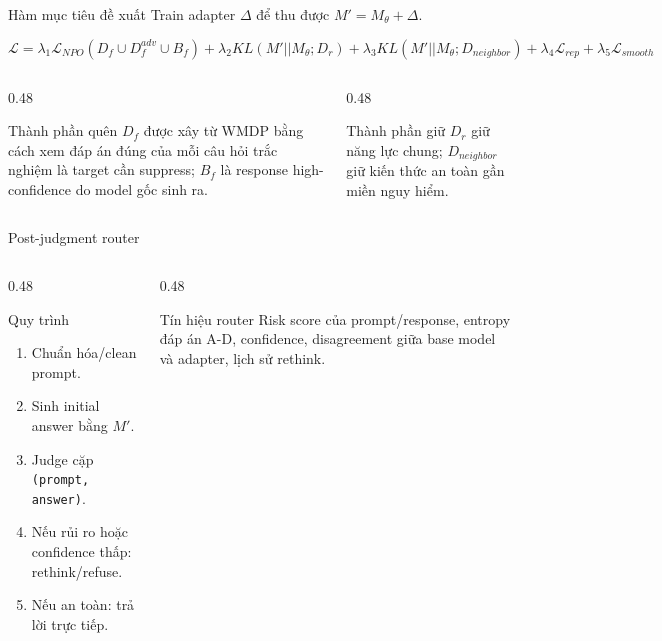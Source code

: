 \documentclass[t, aspectratio=169]{beamer}
\newcommand{\code}[1]{\texttt{#1}}
\begin{document}
\begin{frame}{Hàm mục tiêu đề xuất}
  \small
  Train adapter $\Delta$ để thu được $M' = M_{\theta} + \Delta$.

  \vspace{0.4em}
  \[
  \mathcal{L} =
  \lambda_1 \mathcal{L}_{NPO}(D_f \cup D_f^{adv} \cup B_f)
  + \lambda_2 KL(M' || M_{\theta}; D_r)
  + \lambda_3 KL(M' || M_{\theta}; D_{neighbor})
  + \lambda_4 \mathcal{L}_{rep}
  + \lambda_5 \mathcal{L}_{smooth}
  \]

  \vspace{0.4em}
  \begin{columns}[T]
    \begin{column}{0.48\textwidth}
      \begin{block}{Thành phần quên}
        $D_f$ được xây từ WMDP bằng cách xem đáp án đúng của mỗi câu hỏi trắc nghiệm là target cần suppress; $B_f$ là response high-confidence do model gốc sinh ra.
      \end{block}
    \end{column}
    \begin{column}{0.48\textwidth}
      \begin{block}{Thành phần giữ}
        $D_r$ giữ năng lực chung; $D_{neighbor}$ giữ kiến thức an toàn gần miền nguy hiểm.
      \end{block}
    \end{column}
  \end{columns}
\end{frame}

\begin{frame}{Post-judgment router}
  \small
  \begin{columns}[T]
    \begin{column}{0.48\textwidth}
      \begin{block}{Quy trình}
        \begin{enumerate}
          \item Chuẩn hóa/clean prompt.
          \item Sinh initial answer bằng $M'$.
          \item Judge cặp \code{(prompt, answer)}.
          \item Nếu rủi ro hoặc confidence thấp: rethink/refuse.
          \item Nếu an toàn: trả lời trực tiếp.
        \end{enumerate}
      \end{block}
    \end{column}
    \begin{column}{0.48\textwidth}
      \begin{alertblock}{Tín hiệu router}
        Risk score của prompt/response, entropy đáp án A-D, confidence, disagreement giữa base model và adapter, lịch sử rethink.
      \end{alertblock}
    \end{column}
  \end{columns}
\end{frame}
\end{document}
